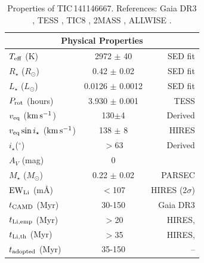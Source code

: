 \documentclass[11pt,twocolumn,tighten,linenumbers]{aastex7}
\newcommand{\kms}{\ensuremath{\rm km\,s^{-1}}}
\begin{document}
\begin{table}
\begin{tabular}{lcr}
    \hline
    \multicolumn{3}{c}{Physical Properties} \\
    \hline
    $T_{\rm eff}$ (K) & 2972 $\pm$ 40 & SED fit \citep{Bouma2024} \\
    $R_\star$ ($R_{\odot}$) & 0.42 $\pm$ 0.02 & SED fit \citep{Bouma2024} \\
    $L_\star$ ($L_\odot$) & 0.0126 $\pm$ 0.0012 & SED fit \citep{Bouma2024} \\
    $P_{\rm rot}$ (hours) & 3.930 $\pm$ 0.001 & TESS \\ 
    $v_{\rm eq}$ (\kms)  &  130$\pm$4  & Derived \\
    $v_{\rm eq} \sin i_\star$ (\kms) & 138 $\pm$ 8 & HIRES \\
    $i_\star$($^\circ$) & $>$63 & Derived \\
    $A_V$ (mag) & 0 & \citep{Green2019} \\
    $M_\star$ ($M_{\odot}$)  & 0.22 $\pm$ 0.02  & PARSEC \citep{Chen2014}\\
    ${\rm EW}_{\rm Li}$ (m\AA) & $<$107 & HIRES (2$\sigma$)\\
    $t_{\rm CAMD}$ (Myr) & 30-150 &  Gaia DR3 \\
    $t_{\rm Li,emp}$ (Myr) & $>$20 &  HIRES, \citep{Jeffries2023} \\
    $t_{\rm Li,th}$ (Myr) & $>$35 &  HIRES, \citep{Feiden2016} \\
    $t_{\rm adopted}$ (Myr) & 35-150 &  -- \\
    \hline
    \end{tabular}
		\caption{Properties of TIC\,141146667.  References:
    Gaia DR3 \citep{GaiaDR3}, TESS \citep{Ricker2015},
    TIC8 \citep{Stassun2019}, 2MASS \citep{Skrutskie2006}, ALLWISE
    \citep{Cutri2014}.}
    \label{tab:stparams}
\end{table}
\end{document}
